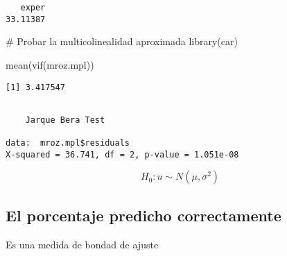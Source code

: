 \documentclass[
  letterpaper,
  DIV=11,
  numbers=noendperiod]{scrreprt}
\newenvironment{Shaded}{\begin{snugshade}}{\end{snugshade}}
\newcommand{\CommentTok}[1]{\textcolor[rgb]{0.37,0.37,0.37}{#1}}
\newcommand{\DecValTok}[1]{\textcolor[rgb]{0.68,0.00,0.00}{#1}}
\newcommand{\FloatTok}[1]{\textcolor[rgb]{0.68,0.00,0.00}{#1}}
\newcommand{\FunctionTok}[1]{\textcolor[rgb]{0.28,0.35,0.67}{#1}}
\newcommand{\NormalTok}[1]{\textcolor[rgb]{0.00,0.23,0.31}{#1}}
\newcommand{\OtherTok}[1]{\textcolor[rgb]{0.00,0.23,0.31}{#1}}
\newcommand{\SpecialCharTok}[1]{\textcolor[rgb]{0.37,0.37,0.37}{#1}}
\newcommand{\StringTok}[1]{\textcolor[rgb]{0.13,0.47,0.30}{#1}}
\begin{document}
\begin{verbatim}
   exper 
33.11387 
\end{verbatim}

\begin{Shaded}
\begin{Highlighting}[]
\CommentTok{\# Probar la multicolinealidad aproximada}
\FunctionTok{library}\NormalTok{(car)}

\FunctionTok{mean}\NormalTok{(}\FunctionTok{vif}\NormalTok{(mroz.mpl))}
\end{Highlighting}
\end{Shaded}

\begin{verbatim}
[1] 3.417547
\end{verbatim}

\begin{Shaded}
\end{Shaded}

\begin{verbatim}

    Jarque Bera Test

data:  mroz.mpl$residuals
X-squared = 36.741, df = 2, p-value = 1.051e-08
\end{verbatim}

\[
H_0: u\sim N(\mu, \sigma^2)
\]

\subsection{El porcentaje predicho
correctamente}\label{el-porcentaje-predicho-correctamente}

Es una medida de bondad de ajuste

\begin{Shaded}
\end{Shaded}
\end{document}
